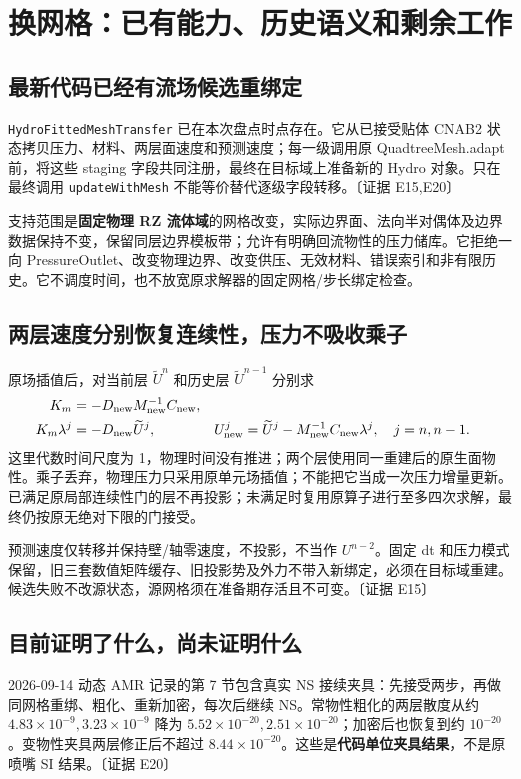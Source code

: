 \documentclass[UTF8,a4paper,11pt,fontset=fandol]{ctexart}
\newcommand{\code}[1]{\nolinkurl{#1}}
\newcommand{\ev}[1]{{\small\color{muted}〔证据 #1〕}}
\begin{document}
\section{换网格：已有能力、历史语义和剩余工作}
\subsection{最新代码已经有流场候选重绑定}
\code{HydroFittedMeshTransfer} 已在本次盘点时点存在。它从已接受贴体 CNAB2 状态拷贝压力、材料、两层面速度和预测速度；每一级调用原 QuadtreeMesh.adapt 前，将这些 staging 字段共同注册，最终在目标域上准备新的 Hydro 对象。只在最终调用 \code{updateWithMesh} 不能等价替代逐级字段转移。\ev{E15,E20}

支持范围是\textbf{固定物理 RZ 流体域}的网格改变，实际边界面、法向半对偶体及边界数据保持不变，保留同层边界模板带；允许有明确回流物性的压力储库。它拒绝一向 PressureOutlet、改变物理边界、改变供压、无效材料、错误索引和非有限历史。它不调度时间，也不放宽原求解器的固定网格/步长绑定检查。

\subsection{两层速度分别恢复连续性，压力不吸收乘子}
原场插值后，对当前层 $\widetilde U^n$ 和历史层 $\widetilde U^{n-1}$ 分别求
\begin{align}
 K_m&=-D_{\rm new}M_{\rm new}^{-1}C_{\rm new},\\
 K_m\lambda^j&=-D_{\rm new}\widetilde U^j,
 &U^j_{\rm new}&=\widetilde U^j-M_{\rm new}^{-1}C_{\rm new}\lambda^j,
 \quad j=n,n-1.\label{eq:remesh}
\end{align}
这里代数时间尺度为 1，物理时间没有推进；两个层使用同一重建后的原生面物性。乘子丢弃，物理压力只采用原单元场插值；不能把它当成一次压力增量更新。已满足原局部连续性门的层不再投影；未满足时复用原算子进行至多四次求解，最终仍按原无绝对下限的门接受。

预测速度仅转移并保持壁/轴零速度，不投影，不当作 $U^{n-2}$。固定 dt 和压力模式保留，旧三套数值矩阵缓存、旧投影势及外力不带入新绑定，必须在目标域重建。候选失败不改源状态，源网格须在准备期存活且不可变。\ev{E15}

\subsection{目前证明了什么，尚未证明什么}
2026-09-14 动态 AMR 记录的第 7 节包含真实 NS 接续夹具：先接受两步，再做同网格重绑、粗化、重新加密，每次后继续 NS。常物性粗化的两层散度从约 $4.83\times10^{-9},3.23\times10^{-9}$ 降为 $5.52\times10^{-20},2.51\times10^{-20}$；加密后也恢复到约 $10^{-20}$。变物性夹具两层修正后不超过 $8.44\times10^{-20}$。这些是\textbf{代码单位夹具结果}，不是原喷嘴 SI 结果。\ev{E20}
\end{document}
